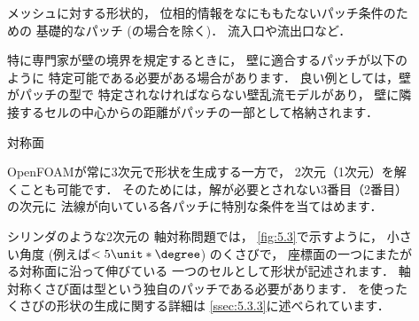 \begin{description}
 \item[]
%
%
            メッシュに対する形状的，
            位相的情報をなにももたないパッチ条件のための
            基礎的なパッチ (の場合を除く)．
            流入口や流出口など．
 \item[]
%
%
            特に専門家が壁の境界を規定するときに，
            壁に適合するパッチが以下のように
            特定可能である必要がある場合があります．
            良い例としては，壁がパッチの型で
            特定されなければならない壁乱流モデルがあり，
            壁に隣接するセルの中心からの距離がパッチの一部として格納されます．
 \item[]
%
%
            対称面
 \item[]
%
%
            OpenFOAMが常に3次元で形状を生成する一方で，
            2次元（1次元）を解くことも可能です．
            そのためには，解が必要とされない3番目（2番目）の次元に
            法線が向いている各パッチに特別な条件を当てはめます．
 \item[]
%
%
            シリンダのような2次元の%
%
            軸対称問題では，
            \autoref{fig:5.3}で示すように，
            小さい角度 (例えば$< 5\unit*{\degree}$) のくさびで，
            座標面の一つにまたがる対称面に沿って伸びている
            一つのセルとして形状が記述されます．
            軸対称くさび面は型という独自のパッチである必要があります．
            を使ったくさびの形状の生成に関する詳細は
            \autoref{ssec:5.3.3}に述べられています．
 \item[]
%
%

\end{description}
